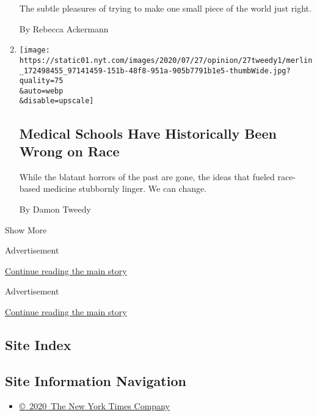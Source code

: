 \begin{enumerate}
  The subtle pleasures of trying to make one small piece of the world
  just right.

  By Rebecca Ackermann
\item
  \href{/2020/07/27/opinion/sunday/coronavirus-medicine-blackness.html}{}

  \texttt{[image: https://static01.nyt.com/images/2020/07/27/opinion/27tweedy1/merlin\_172498455\_97141459-151b-48f8-951a-905b7791b1e5-thumbWide.jpg?quality=75\\\&auto=webp\\\&disable=upscale]}

  \hypertarget{medical-schools-have-historically-been-wrong-on-race}{%
  \subsection{Medical Schools Have Historically Been Wrong on
  Race}\label{medical-schools-have-historically-been-wrong-on-race}}

  While the blatant horrors of the past are gone, the ideas that fueled
  race-based medicine stubbornly linger. We can change.

  By Damon Tweedy
\end{enumerate}

Show More

Advertisement

\protect\hyperlink{after-mid1}{Continue reading the main story}

Advertisement

\protect\hyperlink{after-mktg}{Continue reading the main story}

\hypertarget{site-index}{%
\subsection{Site Index}\label{site-index}}

\hypertarget{site-information-navigation}{%
\subsection{Site Information
Navigation}\label{site-information-navigation}}

\begin{itemize}
\tightlist
\item
  \href{https://help.nytimes.com/hc/en-us/articles/115014792127-Copyright-notice}{©~2020~The
  New York Times Company}
\end{itemize}

